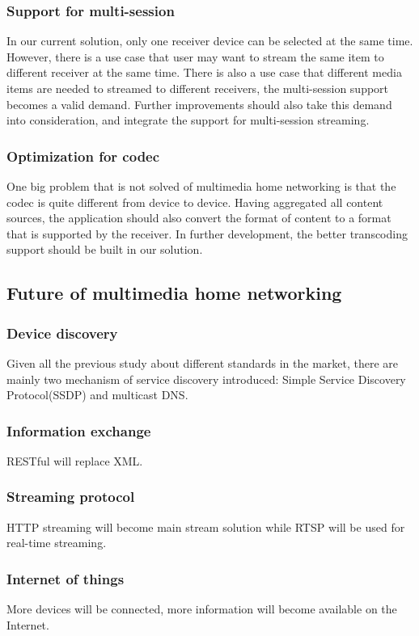 \subsubsection{Support for multi-session}
In our current solution, only one receiver device can be selected at the same time. However, there is a use case that user may want to stream the same item to different receiver at the same time. There is also a use case that different media items are needed to streamed to different receivers, the multi-session support becomes a valid demand. Further improvements should also take this demand into consideration, and integrate the support for multi-session streaming.
\subsubsection{Optimization for codec}
One big problem that is not solved of multimedia home networking is that the codec is quite different from device to device. Having aggregated all content sources, the application should also convert the format of content to a format that is supported by the receiver. In further development, the better transcoding support should be built in our solution.
\subsection{Future of multimedia home networking}
\subsubsection{Device discovery}
Given all the previous study about different standards in the market, there are mainly two mechanism of service discovery introduced: Simple Service Discovery Protocol(SSDP) and multicast DNS.  
\subsubsection{Information exchange}
RESTful will replace XML.
\subsubsection{Streaming protocol}
HTTP streaming will become main stream solution while RTSP will be used for real-time streaming.
\subsubsection{Internet of things}
More devices will be connected, more information will become available on the Internet.